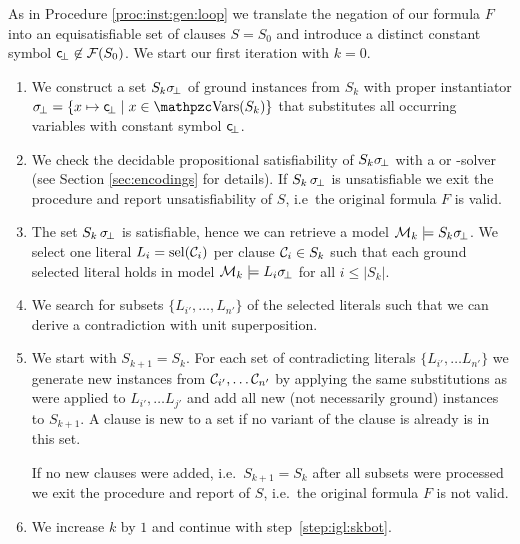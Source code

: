 \begin{procedure}\label{proc:inst:gen:eq:loop}
	As in Procedure \vref{proc:inst:gen:loop} we translate the 
	negation of our formula \( F \) 
	into an equisatisfiable set of clauses
	\( S = S_0 \) and introduce a distinct constant symbol
	\( \mathsf{c} \!_\bot\not\in\mathcal{F}(S_0) \).
	We start our first iteration with \( k=0 \).

	\begin{enumerate}
		\item\label{step:igl:eq:skbot}
		We construct a set \( S_{k}\sigma \!_\bot \) of ground instances from \( S_k \)
		with proper instantiator \( \subsbot = \{ x\mapsto \consbot \mid x\in\var(S_k) \} \)
		that substitutes all occurring variables with constant symbol \( \mathsf{c} \!_\bot \).
%
		\item\label{step:igl:eq:sksat} 
		We check the decidable propositional satisfiability of
		\( S_k\sigma \!_\bot \) with a \SAT{} or \SMT{}-solver
		(see Section \vref{sec:encodings} for details).
		If \( S_k \, \sigma \!_\bot \) is unsatisfiable
		we exit the procedure 
		and report
		{ unsatisfiability} of \( S \), i.e~the original formula \( F \) is valid.

		\item\label{step:igl:eq:model} The set \( S_k \, \sigma \!_\bot \) is satisfiable, hence we can retrieve a model \( \mathcal{M}_k \models S_k\sigma \!_\bot \).
		We select one literal \( L_i = \operatorname{sel}(\mathcal{C}_i) \) per clause \( \mathcal{C}_i \in S_k \)
		such that each ground selected literal holds in model
		\( \mathcal{M}_k\models L_i\sigma \!_\bot \) for all \( i \leq | S_k | \).

		\item\label{step:igl:eq:false} We search for subsets 
		\( \{ L_{i'}, \ldots, L_{n'} \} \) of the selected literals
		such that we can derive a contradiction with unit superposition.

		\item We start with \( S_{k+1} = S_k \). For each set of contradicting literals
		\( \{ L_{i'}, \ldots L_{n'} \} \)
		we generate new instances from \( \mathcal{C}_{i'}, \ldots \mathcal{C}_{n'} \)
		by applying the same substitutions as were applied 
		to \( L_{i'}, \ldots L_{j'} \) 
		and add all new (not necessarily ground) instances to \( S_{k+1} \).
		A clause is new to a set if no variant of the clause is already is in this set.

		If no new clauses were added, i.e.~\( S_{k+1} = S_k \) after all subsets were processed we exit the procedure and report  of \( S \), i.e.~the original formula \( F \) is not valid.

		\item We increase \( k \) by \( 1 \) and continue with step~\ref{step:igl:skbot}.

	\end{enumerate}
\end{procedure}

